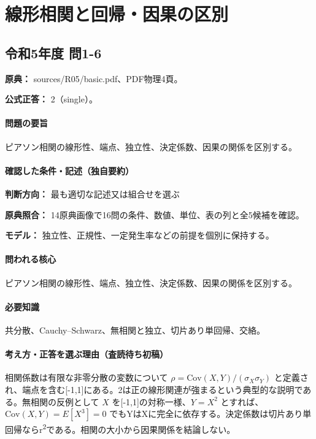 \section{線形相関と回帰・因果の区別}

\subsection{令和5年度 問1-6}
\label{q:r05-reg-basic-1-6}

\noindent\textbf{原典：} sources/R05/basic.pdf、PDF物理4頁。

\textbf{公式正答：} 2（single）。

\paragraph{問題の要旨} ピアソン相関の線形性、端点、独立性、決定係数、因果の関係を区別する。

\paragraph{確認した条件・記述（独自要約）}\mbox{}\par

\noindent\textbf{判断方向：} 最も適切な記述又は組合せを選ぶ\par

\noindent\textbf{原典照合：} 14原典画像で16問の条件、数値、単位、表の列と全5候補を確認。\par

\noindent\textbf{モデル：} 独立性、正規性、一定発生率などの前提を個別に保持する。\par

\paragraph{問われる核心} ピアソン相関の線形性、端点、独立性、決定係数、因果の関係を区別する。

\paragraph{必要知識} 共分散、Cauchy–Schwarz、無相関と独立、切片あり単回帰、交絡。

\paragraph{考え方・正答を選ぶ理由（査読待ち初稿）} 相関係数は有限な非零分散の変数について \(\rho=\mathrm{Cov}(X,Y)/(\sigma_X\sigma_Y)\) と定義され、端点を含む[-1,1]にある。2は正の線形関連が強まるという典型的な説明である。無相関の反例として \(X\) を[-1,1]の対称一様、\(Y=X^2\) とすれば、\(\mathrm{Cov}(X,Y)=E[X^3]=0\) でもYはXに完全に依存する。決定係数は切片あり単回帰ならr\textsuperscript{2}である。相関の大小から因果関係を結論しない。

